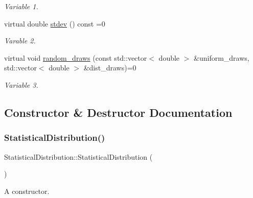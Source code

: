 \begin{DoxyCompactItemize}
\begin{DoxyCompactList}\small\item\em Variable 1. \end{DoxyCompactList}\item 
\mbox{\label{classStatisticalDistribution_af097e57c0d28489af68ca8a4edaebcac}} 
virtual double \hyperlink{classStatisticalDistribution_af097e57c0d28489af68ca8a4edaebcac}{stdev} () const =0
\begin{DoxyCompactList}\small\item\em Varable 2. \end{DoxyCompactList}\item 
\mbox{\label{classStatisticalDistribution_affe04d41cb2e6f9526cc2ad4fb5fb150}} 
virtual void \hyperlink{classStatisticalDistribution_affe04d41cb2e6f9526cc2ad4fb5fb150}{random\+\_\+draws} (const std\+::vector$<$ double $>$ \&uniform\+\_\+draws, std\+::vector$<$ double $>$ \&dist\+\_\+draws)=0
\begin{DoxyCompactList}\small\item\em Variable 3. \end{DoxyCompactList}\end{DoxyCompactItemize}


\subsection{Constructor \& Destructor Documentation}
\mbox{\label{classStatisticalDistribution_a0c968a41a854b3d33310b7bd78a7238a}} 
\subsubsection{\texorpdfstring{Statistical\+Distribution()}{StatisticalDistribution()}}
{\footnotesize\ttfamily Statistical\+Distribution\+::\+Statistical\+Distribution (\begin{DoxyParamCaption}{ }\end{DoxyParamCaption})}



A constructor. 

